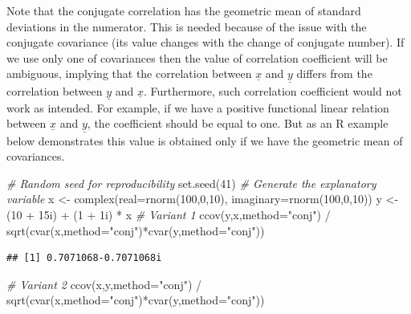 \documentclass[
]{book}
\newenvironment{Shaded}{\begin{snugshade}}{\end{snugshade}}
\newcommand{\AttributeTok}[1]{\textcolor[rgb]{0.77,0.63,0.00}{#1}}
\newcommand{\CommentTok}[1]{\textcolor[rgb]{0.56,0.35,0.01}{\textit{#1}}}
\newcommand{\DecValTok}[1]{\textcolor[rgb]{0.00,0.00,0.81}{#1}}
\newcommand{\FunctionTok}[1]{\textcolor[rgb]{0.00,0.00,0.00}{#1}}
\newcommand{\NormalTok}[1]{#1}
\newcommand{\OtherTok}[1]{\textcolor[rgb]{0.56,0.35,0.01}{#1}}
\newcommand{\SpecialCharTok}[1]{\textcolor[rgb]{0.00,0.00,0.00}{#1}}
\newcommand{\StringTok}[1]{\textcolor[rgb]{0.31,0.60,0.02}{#1}}
\begin{document}
Note that the conjugate correlation has the geometric mean of standard deviations in the numerator. This is needed because of the issue with the conjugate covariance (its value changes with the change of conjugate number). If we use only one of covariances \citep[as done, for example, by][]{Panchev1971} then the value of correlation coefficient will be ambiguous, implying that the correlation between \(\underline{x}\) and \(\underline{y}\) differs from the correlation between \(\underline{y}\) and \(\underline{x}\). Furthermore, such correlation coefficient would not work as intended. For example, if we have a positive functional linear relation between \(\underline{x}\) and \(\underline{y}\), the coefficient should be equal to one. But as an R example below demonstrates this value is obtained only if we have the geometric mean of covariances.

\begin{Shaded}
\begin{Highlighting}[]
\CommentTok{\# Random seed for reproducibility}
\FunctionTok{set.seed}\NormalTok{(}\DecValTok{41}\NormalTok{)}
\CommentTok{\# Generate the explanatory variable}
\NormalTok{x }\OtherTok{\textless{}{-}} \FunctionTok{complex}\NormalTok{(}\AttributeTok{real=}\FunctionTok{rnorm}\NormalTok{(}\DecValTok{100}\NormalTok{,}\DecValTok{0}\NormalTok{,}\DecValTok{10}\NormalTok{), }\AttributeTok{imaginary=}\FunctionTok{rnorm}\NormalTok{(}\DecValTok{100}\NormalTok{,}\DecValTok{0}\NormalTok{,}\DecValTok{10}\NormalTok{))}
\NormalTok{y }\OtherTok{\textless{}{-}}\NormalTok{ (}\DecValTok{10} \SpecialCharTok{+}\NormalTok{ 15i) }\SpecialCharTok{+}\NormalTok{ (}\DecValTok{1} \SpecialCharTok{+}\NormalTok{ 1i) }\SpecialCharTok{*}\NormalTok{ x}
\CommentTok{\# Variant 1}
\FunctionTok{ccov}\NormalTok{(y,x,}\AttributeTok{method=}\StringTok{"conj"}\NormalTok{) }\SpecialCharTok{/}
    \FunctionTok{sqrt}\NormalTok{(}\FunctionTok{cvar}\NormalTok{(x,}\AttributeTok{method=}\StringTok{"conj"}\NormalTok{)}\SpecialCharTok{*}\FunctionTok{cvar}\NormalTok{(y,}\AttributeTok{method=}\StringTok{"conj"}\NormalTok{))}
\end{Highlighting}
\end{Shaded}

\begin{verbatim}
## [1] 0.7071068-0.7071068i
\end{verbatim}

\begin{Shaded}
\begin{Highlighting}[]
\CommentTok{\# Variant 2}
\FunctionTok{ccov}\NormalTok{(x,y,}\AttributeTok{method=}\StringTok{"conj"}\NormalTok{) }\SpecialCharTok{/}
    \FunctionTok{sqrt}\NormalTok{(}\FunctionTok{cvar}\NormalTok{(x,}\AttributeTok{method=}\StringTok{"conj"}\NormalTok{)}\SpecialCharTok{*}\FunctionTok{cvar}\NormalTok{(y,}\AttributeTok{method=}\StringTok{"conj"}\NormalTok{))}
\end{Highlighting}
\end{Shaded}
\end{document}
